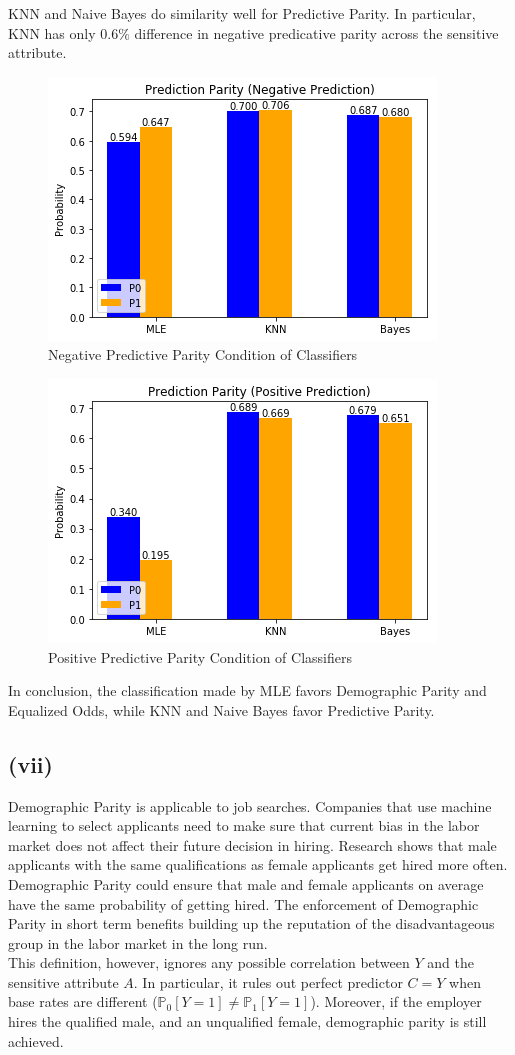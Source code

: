 \documentclass[twoside,11pt]{homework}
\begin{document}
	KNN and Naive Bayes do similarity well for Predictive Parity. In particular, KNN has only $0.6\%$ difference in 
	negative predicative parity across the sensitive attribute.
	\begin{figure}[H]
		\centering
		\includegraphics[scale=.5]{q5_fig/pp_neg.png}	
		\caption{Negative Predictive Parity Condition of Classifiers}
	\end{figure}
	\begin{figure}[H]
		\centering
		\includegraphics[scale=.5]{q5_fig/pp_pos.png}	
		\caption{Positive Predictive Parity Condition of Classifiers}
	\end{figure}
	In conclusion, the classification made by MLE favors Demographic Parity and Equalized Odds, while 
	KNN and Naive Bayes favor Predictive Parity.
\subsection*{(vii)}  
	Demographic Parity is applicable to job searches. Companies that use machine learning to select applicants need to make sure 
	that current bias in the labor market does not affect their future decision in hiring. 
	Research shows that male applicants with the same qualifications as female applicants get hired more often. 
	Demographic Parity could ensure that male and female applicants on average have the same probability of getting hired.
	The enforcement of Demographic Parity in short term benefits building up the reputation of the disadvantageous group 
	in the labor market in the long run.\\
	This definition, however, ignores any possible correlation between $Y$ and the sensitive attribute $A$. 
	In particular, it rules out perfect predictor $C=Y$ when base rates are different ($\mathbb{P}_0 [Y=1] \neq \mathbb{P}_1[Y=1]$).
	Moreover, if the employer hires the qualified male,
	and an unqualified female, demographic parity is still achieved. 
\end{document}
